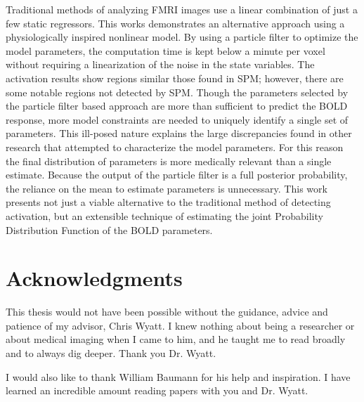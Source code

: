 \documentclass[12pt]{report}
\numberwithin{algorithm}{chapter}
\begin{document}
Traditional methods of analyzing FMRI images use a linear combination of
just a few static regressors. This works demonstrates an alternative
approach using a physiologically inspired nonlinear model. By using a 
particle filter to optimize the model parameters, the computation time
is kept below a minute per voxel without requiring a linearization 
of the noise in the state
variables. The activation results show regions similar those found in 
SPM; however, there are some notable regions not detected by 
SPM. Though the parameters selected by the particle filter based approach
are more than sufficient to predict the BOLD response,
more model constraints are needed to uniquely identify a single set
of parameters. This ill-posed nature explains the large discrepancies
found in other research that attempted to characterize the model parameters.
For this reason the final distribution of parameters is more medically relevant
than a single estimate. Because the output of the particle filter is 
a full posterior probability, the reliance on the mean to estimate 
parameters is unnecessary. This work presents
not just a viable alternative to the traditional method of detecting
activation, but an extensible technique of estimating the joint Probability
Distribution Function of the BOLD parameters.

\vfill



\pagebreak

\chapter*{Acknowledgments}

This thesis would not have been possible without the guidance, advice and
patience of my advisor, Chris Wyatt. I knew nothing about being a researcher
or about medical imaging when I came to him, and he taught me to read broadly
and to always dig deeper. Thank you Dr. Wyatt.

I would also like to thank William Baumann for his help and inspiration. I
have learned an incredible amount reading papers with you and Dr. Wyatt.
\end{document}
